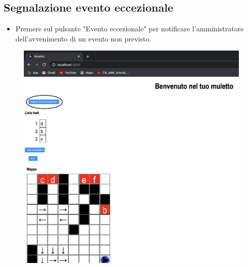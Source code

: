 \subsection{Segnalazione evento eccezionale}
\begin{itemize}
    \item Premere sul pulsante "Evento eccezionale" per notificare l'amministratore dell'avvenimento di un evento non previsto.
\end{itemize}
\begin{figure}[H]
    \centering
    \includegraphics[scale=0.4]{res/images/forklift_evento.png}
\end{figure}